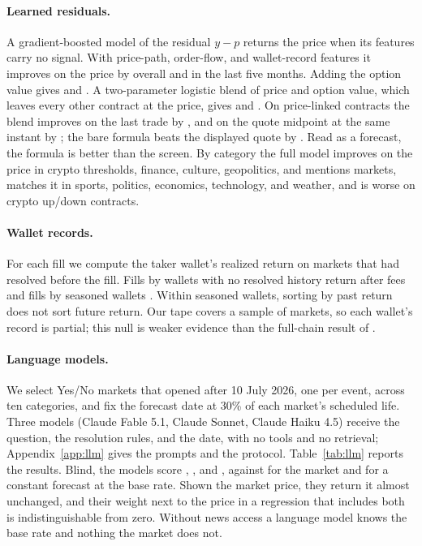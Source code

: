 \documentclass[format=acmsmall, review=false]{acmart}
\begin{document}
\paragraph{Learned residuals.} A gradient-boosted model of the residual $y-p$ returns the price when its features carry no signal. With price-path, order-flow, and wallet-record features it improves on the price by \skillResFlowAll{} overall and \skillResFlowHold{} in the last five months. Adding the option value gives \skillResFullAll{} and \skillResFullHold{}. A two-parameter logistic blend of price and option value, which leaves every other contract at the price, gives \skillBlendAll{} and \skillBlendHold{}. On price-linked contracts the blend improves on the last trade by \plSkillBlend{}, and on the quote midpoint at the same instant by \plMidBlend{}; the bare formula beats the displayed quote by \plMidFair{}. Read as a forecast, the formula is better than the screen. By category the full model improves on the price in crypto thresholds, finance, culture, geopolitics, and mentions markets, matches it in sports, politics, economics, technology, and weather, and is worse on crypto up/down contracts.

\paragraph{Wallet records.} For each fill we compute the taker wallet's realized return on markets that had resolved before the fill. Fills by wallets with no resolved history return \firstTimers{} after fees and fills by seasoned wallets \seasoned{}. Within seasoned wallets, sorting by past return does not sort future return. Our tape covers a sample of markets, so each wallet's record is partial; this null is weaker evidence than the full-chain result of \citet{gomezcram2026prediction}.

\paragraph{Language models.} We select \llmN{} Yes/No markets that opened after 10 July 2026, one per event, across ten categories, and fix the forecast date at 30\% of each market's scheduled life. Three models (Claude Fable 5.1, Claude Sonnet, Claude Haiku 4.5) receive the question, the resolution rules, and the date, with no tools and no retrieval; Appendix~\ref{app:llm} gives the prompts and the protocol. Table~\ref{tab:llm} reports the results. Blind, the models score \llmBlindFable{}, \llmBlindSonnet{}, and \llmBlindHaiku{}, against \llmMarket{} for the market and \llmBase{} for a constant forecast at the base rate. Shown the market price, they return it almost unchanged, and their weight next to the price in a regression that includes both is indistinguishable from zero. Without news access a language model knows the base rate and nothing the market does not.
\end{document}
